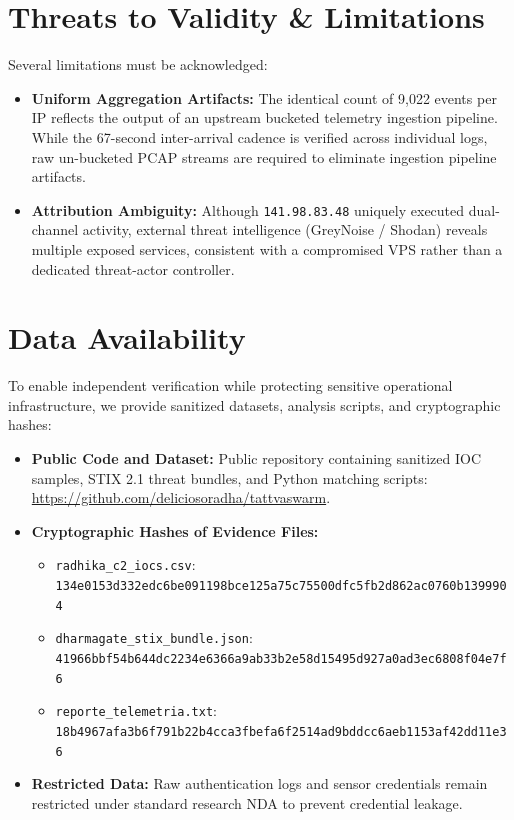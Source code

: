 \documentclass[10pt,twocolumn]{article}
\begin{document}
\section{Threats to Validity \& Limitations}
Several limitations must be acknowledged:
\begin{itemize}
    \item \textbf{Uniform Aggregation Artifacts:} The identical count of 9,022 events per IP reflects the output of an upstream bucketed telemetry ingestion pipeline. While the 67-second inter-arrival cadence is verified across individual logs, raw un-bucketed PCAP streams are required to eliminate ingestion pipeline artifacts.
    \item \textbf{Attribution Ambiguity:} Although \texttt{141.98.83.48} uniquely executed dual-channel activity, external threat intelligence (GreyNoise / Shodan) reveals multiple exposed services, consistent with a compromised VPS rather than a dedicated threat-actor controller.
\end{itemize}

\section{Data Availability}
To enable independent verification while protecting sensitive operational infrastructure, we provide sanitized datasets, analysis scripts, and cryptographic hashes:
\begin{itemize}
    \item \textbf{Public Code and Dataset:} Public repository containing sanitized IOC samples, STIX 2.1 threat bundles, and Python matching scripts: \url{https://github.com/deliciosoradha/tattvaswarm}.
    \item \textbf{Cryptographic Hashes of Evidence Files:}
    \begin{itemize}
        \item \texttt{radhika\_c2\_iocs.csv}: \texttt{134e0153d332edc6be091198bce125a75c75500dfc5fb2d862ac0760b1399904}
        \item \texttt{dharmagate\_stix\_bundle.json}: \texttt{41966bbf54b644dc2234e6366a9ab33b2e58d15495d927a0ad3ec6808f04e7f6}
        \item \texttt{reporte\_telemetria.txt}: \texttt{18b4967afa3b6f791b22b4cca3fbefa6f2514ad9bddcc6aeb1153af42dd11e36}
    \end{itemize}
    \item \textbf{Restricted Data:} Raw authentication logs and sensor credentials remain restricted under standard research NDA to prevent credential leakage.
\end{itemize}
\end{document}
